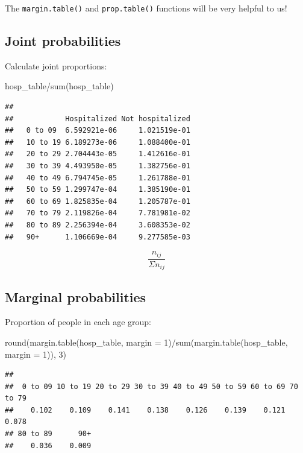 \documentclass[
  openany]{book}
\newenvironment{Shaded}{\begin{snugshade}}{\end{snugshade}}
\newcommand{\AttributeTok}[1]{\textcolor[rgb]{0.77,0.63,0.00}{#1}}
\newcommand{\DecValTok}[1]{\textcolor[rgb]{0.00,0.00,0.81}{#1}}
\newcommand{\FunctionTok}[1]{\textcolor[rgb]{0.00,0.00,0.00}{#1}}
\newcommand{\NormalTok}[1]{#1}
\newcommand{\SpecialCharTok}[1]{\textcolor[rgb]{0.00,0.00,0.00}{#1}}
\begin{document}
The \texttt{margin.table()} and \texttt{prop.table()} functions will be very helpful
to us!

\hypertarget{joint-probabilities}{%
\subsection{Joint probabilities}\label{joint-probabilities}}

Calculate joint proportions:

\begin{Shaded}
\begin{Highlighting}[]
\NormalTok{hosp\_table}\SpecialCharTok{/}\FunctionTok{sum}\NormalTok{(hosp\_table)}
\end{Highlighting}
\end{Shaded}

\begin{verbatim}
##           
##            Hospitalized Not hospitalized
##   0 to 09  6.592921e-06     1.021519e-01
##   10 to 19 6.189273e-06     1.088400e-01
##   20 to 29 2.704443e-05     1.412616e-01
##   30 to 39 4.493950e-05     1.382756e-01
##   40 to 49 6.794745e-05     1.261788e-01
##   50 to 59 1.299747e-04     1.385190e-01
##   60 to 69 1.825835e-04     1.205787e-01
##   70 to 79 2.119826e-04     7.781981e-02
##   80 to 89 2.256394e-04     3.608353e-02
##   90+      1.106669e-04     9.277585e-03
\end{verbatim}

\[\frac{n_{ij}}{\Sigma n_{ij}}\]

\hypertarget{marginal-probabilities}{%
\subsection{Marginal probabilities}\label{marginal-probabilities}}

Proportion of people in each age group:

\begin{Shaded}
\begin{Highlighting}[]
\FunctionTok{round}\NormalTok{(}\FunctionTok{margin.table}\NormalTok{(hosp\_table, }\AttributeTok{margin =} \DecValTok{1}\NormalTok{)}\SpecialCharTok{/}\FunctionTok{sum}\NormalTok{(}\FunctionTok{margin.table}\NormalTok{(hosp\_table, }\AttributeTok{margin =} \DecValTok{1}\NormalTok{)), }\DecValTok{3}\NormalTok{)}
\end{Highlighting}
\end{Shaded}

\begin{verbatim}
## 
##  0 to 09 10 to 19 20 to 29 30 to 39 40 to 49 50 to 59 60 to 69 70 to 79 
##    0.102    0.109    0.141    0.138    0.126    0.139    0.121    0.078 
## 80 to 89      90+ 
##    0.036    0.009
\end{verbatim}
\end{document}
